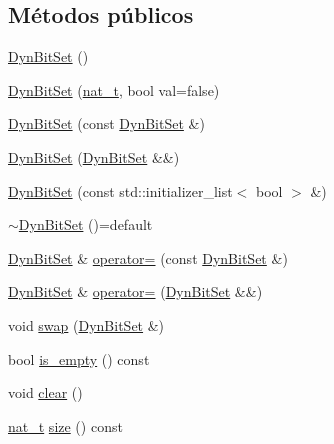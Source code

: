 \subsection*{Métodos públicos}
\begin{DoxyCompactItemize}
\item 
\hyperlink{class_designar_1_1_dyn_bit_set_a41e552380bd305a4069900b1e6b655e8}{Dyn\+Bit\+Set} ()
\item 
\hyperlink{class_designar_1_1_dyn_bit_set_a212b47cbc4cc6c3424d0906924790734}{Dyn\+Bit\+Set} (\hyperlink{namespace_designar_aa72662848b9f4815e7bf31a7cf3e33d1}{nat\+\_\+t}, bool val=false)
\item 
\hyperlink{class_designar_1_1_dyn_bit_set_a43501b702a17c0ab0aa2316861a1e536}{Dyn\+Bit\+Set} (const \hyperlink{class_designar_1_1_dyn_bit_set}{Dyn\+Bit\+Set} \&)
\item 
\hyperlink{class_designar_1_1_dyn_bit_set_ad974f6f490c9e97d8c149c1d8d9be6c8}{Dyn\+Bit\+Set} (\hyperlink{class_designar_1_1_dyn_bit_set}{Dyn\+Bit\+Set} \&\&)
\item 
\hyperlink{class_designar_1_1_dyn_bit_set_a4e1f211af29be8c968e23666b5e8641e}{Dyn\+Bit\+Set} (const std\+::initializer\+\_\+list$<$ bool $>$ \&)
\item 
\hyperlink{class_designar_1_1_dyn_bit_set_a5215370dcc0022588d2d8c9484d65c7a}{$\sim$\+Dyn\+Bit\+Set} ()=default
\item 
\hyperlink{class_designar_1_1_dyn_bit_set}{Dyn\+Bit\+Set} \& \hyperlink{class_designar_1_1_dyn_bit_set_a851472c8fbea77e9be47b39584df227d}{operator=} (const \hyperlink{class_designar_1_1_dyn_bit_set}{Dyn\+Bit\+Set} \&)
\item 
\hyperlink{class_designar_1_1_dyn_bit_set}{Dyn\+Bit\+Set} \& \hyperlink{class_designar_1_1_dyn_bit_set_a1302731fc0c006fca16137697529dc39}{operator=} (\hyperlink{class_designar_1_1_dyn_bit_set}{Dyn\+Bit\+Set} \&\&)
\item 
void \hyperlink{class_designar_1_1_dyn_bit_set_a376fe3b34a2a0c93bde8f33ff2947e64}{swap} (\hyperlink{class_designar_1_1_dyn_bit_set}{Dyn\+Bit\+Set} \&)
\item 
bool \hyperlink{class_designar_1_1_dyn_bit_set_a07337c0749b7b75ffbd6e9ff56348963}{is\+\_\+empty} () const
\item 
void \hyperlink{class_designar_1_1_dyn_bit_set_af73666f08fda747f5d2dd9c1343f884f}{clear} ()
\item 
\hyperlink{namespace_designar_aa72662848b9f4815e7bf31a7cf3e33d1}{nat\+\_\+t} \hyperlink{class_designar_1_1_dyn_bit_set_a0107a8946533f6b8dc9a225a2f5b91a9}{size} () const

\end{DoxyCompactItemize}
